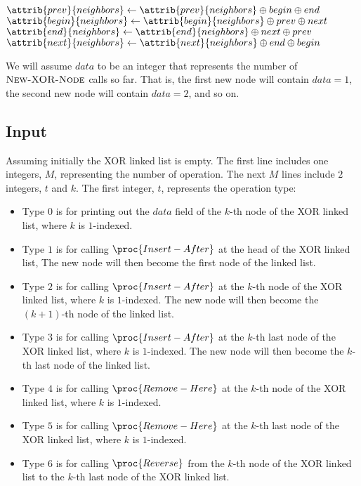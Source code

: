 \begin{codebox}
\li $\attrib{prev}{neighbors} \gets \attrib{prev}{neighbors} \oplus begin \oplus end$
\li $\attrib{begin}{neighbors} \gets \attrib{begin}{neighbors} \oplus prev \oplus next$
\li $\attrib{end}{neighbors} \gets \attrib{end}{neighbors} \oplus next \oplus prev$
\li $\attrib{next}{neighbors} \gets \attrib{next}{neighbors} \oplus end \oplus begin$
\End
\end{codebox}

We will assume $data$ to be an integer that represents the number of $\textsc{New-XOR-Node}$ calls so far. That is, the first new node will contain $data = 1$, the second new node will contain $data = 2$, and so on.

\subsection{Input}\label{input}

Assuming initially the XOR linked list is empty. The first line includes one integers, $M$, representing the number of operation. The next $M$ lines include $2$ integers, $t$ and $k$. The first integer, $t$, represents the operation type:
\begin{itemize}
    \item Type $0$ is for printing out the $data$ field of the $k$-th node of the XOR linked list, where $k$ is $1$-indexed.
    \item Type $1$ is for calling $\proc{Insert-After}$ at the head of the XOR linked list, The new node will then become the first node of the linked list.
    \item Type $2$ is for calling $\proc{Insert-After}$ at the $k$-th node of the XOR linked list, where $k$ is $1$-indexed. The new node will then become the $(k+1)$-th node of the linked list.
    \item Type $3$ is for calling $\proc{Insert-After}$ at the $k$-th last node of the XOR linked list, where $k$ is $1$-indexed. The new node will then become the $k$-th last node of the linked list.
    \item Type $4$ is for calling $\proc{Remove-Here}$ at the $k$-th node of the XOR linked list, where $k$ is $1$-indexed.
    \item Type $5$ is for calling $\proc{Remove-Here}$ at the $k$-th last node of the XOR linked list, where $k$ is $1$-indexed. 
    \item Type $6$ is for calling $\proc{Reverse}$ from the $k$-th node of the XOR linked list to the $k$-th last node of the XOR linked list.
\end{itemize}

